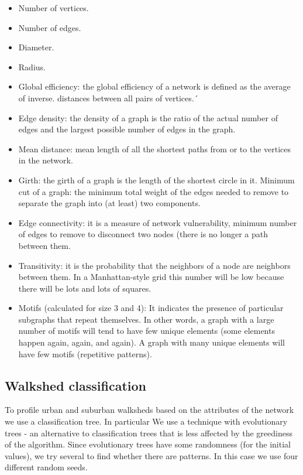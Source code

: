 \documentclass[preprint, 3p,
authoryear]{elsarticle} %
\providecommand{\tightlist}{%
  \setlength{\itemsep}{0pt}\setlength{\parskip}{0pt}}
\begin{document}
\begin{itemize}
\tightlist
\item
  Number of vertices.
\item
  Number of edges.
\item
  Diameter.
\item
  Radius.
\item
  Global efficiency: the global efficiency of a network is defined as
  the average of inverse. distances between all pairs of vertices.´
\item
  Edge density: the density of a graph is the ratio of the actual number
  of edges and the largest possible number of edges in the graph.
\item
  Mean distance: mean length of all the shortest paths from or to the
  vertices in the network.
\item
  Girth: the girth of a graph is the length of the shortest circle in
  it. Minimum cut of a graph: the minimum total weight of the edges
  needed to remove to separate the graph into (at least) two components.
\item
  Edge connectivity: it is a measure of network vulnerability, minimum
  number of edges to remove to disconnect two nodes (there is no longer
  a path between them.
\item
  Transitivity: it is the probability that the neighbors of a node are
  neighbors between them. In a Manhattan-style grid this number will be
  low because there will be lots and lots of squares.
\item
  Motifs (calculated for size 3 and 4): It indicates the presence of
  particular subgraphs that repeat themselves. In other words, a graph
  with a large number of motifs will tend to have few unique elements
  (some elements happen again, again, and again). A graph with many
  unique elements will have few motifs (repetitive patterns).
\end{itemize}

\subsection{Walkshed classification}\label{walkshed-classification}

To profile urban and suburban walksheds based on the attributes of the
network we use a classification tree. In particular We use a technique
with evolutionary trees - an alternative to classification trees that is
less affected by the greediness of the algorithm. Since evolutionary
trees have some randomness (for the initial values), we try several to
find whether there are patterns. In this case we use four different
random seeds.

\renewcommand\refname{References}

\end{document}
